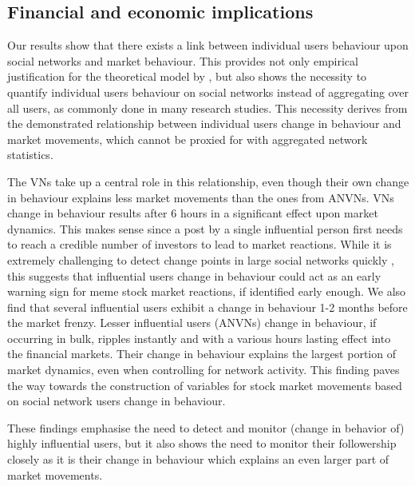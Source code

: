 




\subsection{Financial and economic implications}
\label{econ_implications}
Our results show that there exists a link between individual users behaviour upon social networks and market behaviour. This provides not only empirical justification for the theoretical model by \textcite{Pedersen2022}, but also shows the necessity to quantify individual users behaviour on social networks instead of aggregating over all users, as commonly done in many research studies. This necessity derives from the demonstrated relationship between individual users change in behaviour and market movements, which cannot be proxied for with aggregated network statistics. 

The VNs take up a central role in this relationship, even though their own change in behaviour explains less market movements than the ones from ANVNs. 
VNs change in behaviour results after 6 hours in a significant effect upon market dynamics. This makes sense since a post by a single influential person first needs to reach a credible number of investors to lead to market reactions. While it is extremely challenging to detect change points in large social networks quickly \citep{Yu2022monitoring,zwetsloot2025online}, this suggests that influential users change in behaviour could act as an early warning sign for meme stock market reactions, if identified early enough. We also find that several influential users exhibit a change in behaviour 1-2 months before the market frenzy. %
Lesser influential users (ANVNs) change in behaviour, if occurring in bulk, ripples instantly and with a various hours lasting effect into the financial markets. Their change in behaviour explains the largest portion of market dynamics, even when controlling for network activity. This finding paves the way towards the construction of variables for stock market movements based on social network users change in behaviour. 

These findings emphasise the need to detect and monitor (change in behavior of) highly influential users, but it also shows the need to monitor their followership closely as it is their change in behaviour which explains an even larger part of market movements. 




